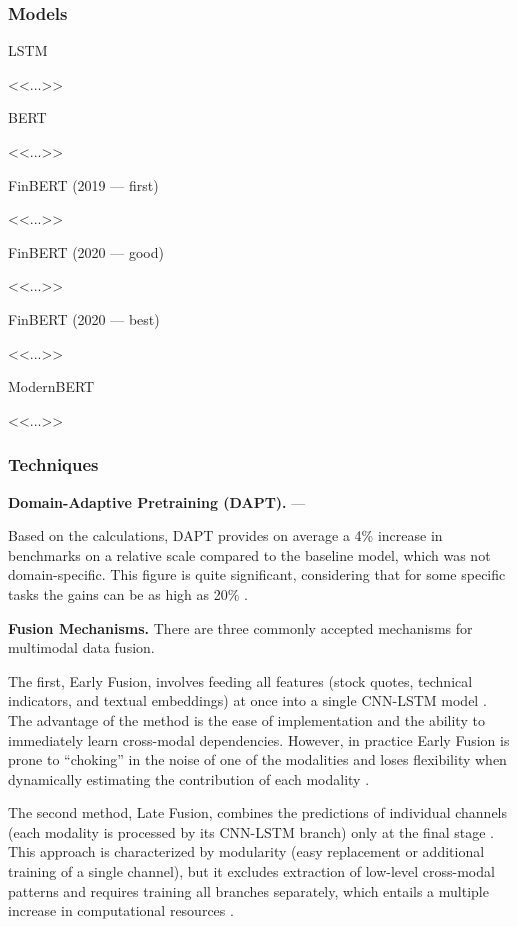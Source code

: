 \subsubsection{Models}
LSTM \parencite{Hochreiter1997LSTM}

<<...>>

BERT \parencite{devlin2019BERT}

<<...>>

FinBERT (2019 --- first) \parencite{Araci2019FinBERT}

<<...>>

FinBERT (2020 --- good) \parencite{Yang2020FinBERT, Huang2023FinBERT}

<<...>>

FinBERT (2020 --- best) \parencite{Liu2020FinBERT}

<<...>>

ModernBERT \parencite{Warner2024ModernBERT}

<<...>>

\subsubsection{Techniques}
\textbf{Domain-Adaptive Pretraining (DAPT).} --- \parencite{gururangan2020DAPT}

Based on the calculations, DAPT provides on average a 4\% increase in benchmarks on a relative scale compared to the baseline model,
which was not domain-specific. This figure is quite significant, considering that for some specific tasks the gains can be as high as 20\%
\parencite*{gururangan2020DAPT}.

\textbf{Fusion Mechanisms.} There are three commonly accepted mechanisms for multimodal data fusion.

The first, Early Fusion, involves feeding all features (stock quotes, technical indicators, and textual embeddings)
at once into a single CNN-LSTM model \parencite{Karpathy_2014_CVPR, dutt2022shared}. The advantage of the method
is the ease of implementation and the ability to immediately learn cross-modal dependencies. However, in practice
Early Fusion is prone to “choking” in the noise of one of the modalities and loses flexibility when dynamically
estimating the contribution of each modality \parencite{dutt2022shared}.

The second method, Late Fusion, combines the predictions of individual channels (each modality is processed by its
CNN-LSTM branch) only at the final stage \parencite{Karpathy_2014_CVPR, ortega2019multimodal}. This approach is characterized
by modularity (easy replacement or additional training of a single channel), but it excludes extraction of low-level
cross-modal patterns and requires training all branches separately, which entails a multiple increase in computational
resources \parencite{joze2020mmtm}.

